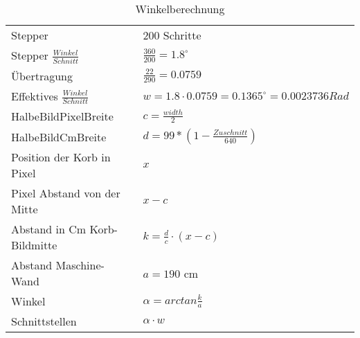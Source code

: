 
\begin{table}[h!]
	\renewcommand{\arraystretch}{1.5}
	\centering
	\begin{tabular}{l l}
		Stepper & 200 Schritte \\
		Stepper $\frac{Winkel}{Schnitt}$ & $\frac{360}{200} = 1.8^\circ$ \\
		Übertragung & $\frac{22}{290} = 0.0759$ \\
		Effektives $\frac{Winkel}{Schnitt}$ & $w = 1.8 \cdot 0.0759 = 0.1365^\circ = 0.0023736 Rad$ \\
		HalbeBildPixelBreite & $c = \frac{width}{2}$ \\
		HalbeBildCmBreite & $d = 99*(1-\frac{Zuschnitt}{640})$ \\
		Position der Korb in Pixel & $x$ \\
		Pixel Abstand von der Mitte & $x - c$ \\
		Abstand in Cm Korb-Bildmitte & $k = \frac{d}{c} \cdot (x-c)$ \\
		Abstand Maschine-Wand & $a = 190$ cm \\
		Winkel & $\alpha = arctan\frac{k}{a}$ \\
		Schnittstellen & $\alpha \cdot w$ \\
	\end{tabular}
	\caption{Winkelberechnung}
\end{table}